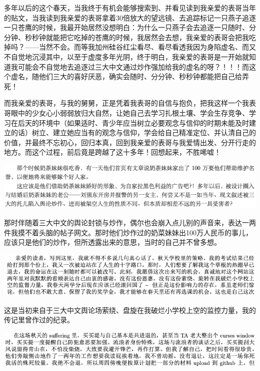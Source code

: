 \documentclass[9pt, b5paper]{article}
\begin{document}
多年以后的这个春天，当我终于有机会能够搜索到、并看见读到我亲爱的表哥当年的贴文，当我读到我亲爱的表哥拿着30倍放大的望远镜、去追踪标记一只燕子追逐一只苍鹰的时候，我最开始居然没想明白：为什么一只燕子会去追逐一只随时、分分钟、秒秒钟就能把它吃掉的苍鹰的时候，我居然会去想，我亲爱的表哥会把我吃掉吗？——当然不会。而等我加州硅谷红尘看尽、看尽看透我因为身陷虚名、而又不自觉地沉浸其中，以至于虚度多年光阴，终于明白，我亲爱的表哥是一开始就知道我可能会不自觉地去追逐过三大中文通过炒作强加给我的虚名的呀？！！！而这个虚名，随他们三大的喜好厌恶，确实会随时、分分钟、秒秒钟都能把自己给弄死！

而我亲爱的表哥，与我的舅舅，正是凭着我表哥的自信与抱负，把我这样一个我表哥眼中的少女心小弱弱放归大自然，让她自己去学习扎根土壤、学会生存竞争、学习在后天的环境中（如果适时、青少年应当树立必要观念与信仰的时期未能及时建立的话）树立、建立她应当有的观念与信仰，学会给自己精准定位、并认清自己的价值，并最终不忘初心，回归本真，回到我亲爱的表哥与我爱情出发、分开行走的地方。而这个过程，前后竟是跨越了这十多年！回想起来，不胜唏嘘！

\begin{center}
\includegraphics[width=.9\linewidth]{./pic/backups_plans_20210424_100357.png}
\end{center}

那时伴随着三大中文的舆论封锁与炒作，偶尔也会崩入点儿别的声音来，表达一两件我摸不着头脑的帖子网文。那时他们炒作过的奶菜妹妹出100万人民币的事儿，应该只是他们的炒作，但所透露出来的意思，当时的自己并不曾多想。 

\begin{center}
\includegraphics[width=.9\linewidth]{./pic/readme_20210502_132448.png}
\end{center}

这是当初来自于三大中文舆论场萦绕、盘旋在我破烂小学校上空的监控力量，我的传记里曾作过的纪录。

\begin{center}
\includegraphics[width=.9\linewidth]{./pic/backups_plans_20210424_103217.png}
\end{center}
\end{document}
